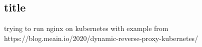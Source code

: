 
\chapter{}%
\label{ch:methodologie}


\lstset{
    language=yaml
    basicstyle=\ttfamily,
    columns=fullflexible,
    frame=single,
    breaklines=true
}

\section{title}
trying to run nginx on kubernetes with example from https://blog.meain.io/2020/dynamic-reverse-proxy-kubernetes/

